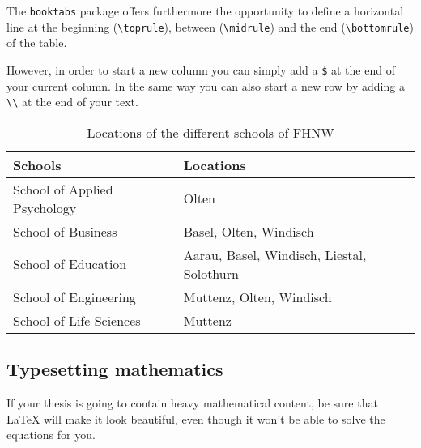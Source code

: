 The \texttt{booktabs} package offers furthermore the opportunity to define a horizontal line at the beginning (\verb!\toprule!), between (\verb!\midrule!) and the end (\verb!\bottomrule!) of the table. 

However, in order to start a new column you can simply add a \texttt{\$} at the end of your current column. In the same way you can also start a new row by adding a \verb!\\! at the end of your text.

\begin{table}[!h]
    \begin{tabular}{p{5cm} p{8cm}}

    \toprule
    
    \textbf{Schools} & \textbf{Locations}\\
    
    \midrule
    
    School of Applied Psychology & 
    Olten\\
    
    \midrule
    
    School of Business &
    Basel, Olten, Windisch\\
    
    \midrule
    
    School of Education &
    Aarau, Basel, Windisch, Liestal, Solothurn\\
    
    \midrule
    
    School of Engineering &
    Muttenz, Olten, Windisch\\
    
    \midrule
    
    School of Life Sciences &
    Muttenz\\
    
    \bottomrule
                         
    \end{tabular}
  \caption{Locations of the different schools of FHNW}
  \label{table:FHNWLocations}
\end{table}

\subsection{Typesetting mathematics}

If your thesis is going to contain heavy mathematical content, be sure that \LaTeX{} will make it look beautiful, even though it won't be able to solve the equations for you.

